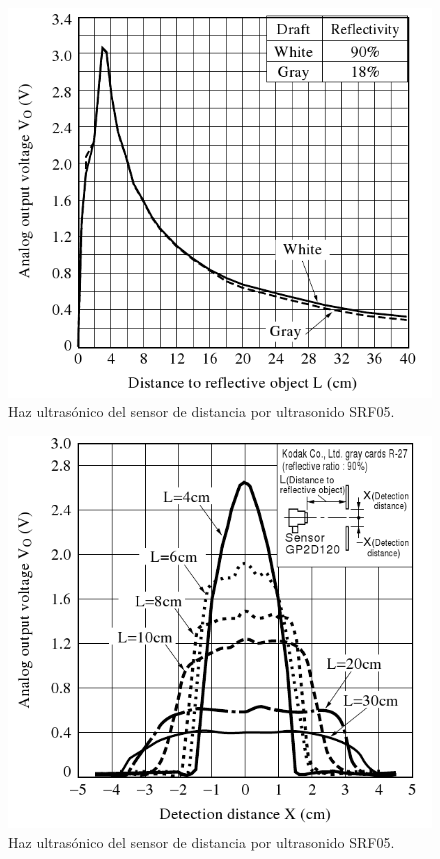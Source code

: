 \begin{figure}[ht]
	\centering
	\includegraphics[scale=0.35]{tel-VxL.png}
	\caption{Haz ultras\'onico del sensor de distancia por ultrasonido SRF05.}
	\label{HFteldistancia}
\end{figure}


\begin{figure}[ht]
	\centering
	\includegraphics[scale=0.35]{tel-VxX.png}
	\caption{Haz ultras\'onico del sensor de distancia por ultrasonido SRF05.}
	\label{HFtelapertura}
\end{figure}

